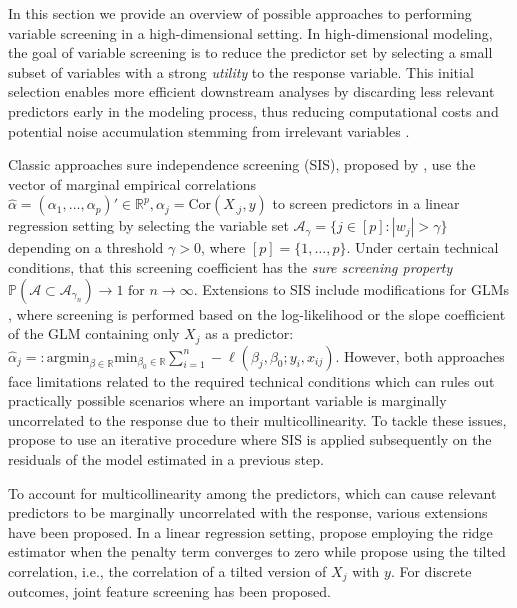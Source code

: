 \documentclass[
  article]{jss}
\begin{document}
In this section we provide an overview of possible approaches to
performing variable screening in a high-dimensional setting. In
high-dimensional modeling, the goal of variable screening is to reduce
the predictor set by selecting a small subset of variables with a strong
\emph{utility} to the response variable. This initial selection enables
more efficient downstream analyses by discarding less relevant
predictors early in the modeling process, thus reducing computational
costs and potential noise accumulation stemming from irrelevant
variables \citep[see e.g.,][]{Dunson2020TargRandProj}.

Classic approaches sure independence screening (SIS), proposed by
\citet{Fan2007SISforUHD}, use the vector of marginal empirical
correlations
\(\hat\alpha=(\alpha_1,\ldots ,\alpha_p)'\in\mathbb{R}^p,\alpha_j=\text{Cor}(X_{.j},y)\)
to screen predictors in a linear regression setting by selecting the
variable set \(\mathcal{A}_\gamma = \{j\in [p]:|w_j|>\gamma\}\)
depending on a threshold \(\gamma>0\), where \([p]=\{1,\dots,p\}\).
Under certain technical conditions, that this screening coefficient has
the \emph{sure screening property}
\(\mathbb{P}(\mathcal{A} \subset \mathcal{A}_{\gamma_n})\to 1 \text{ for } n\to \infty\).
Extensions to SIS include modifications for GLMs \citep{Fan2010sisglms},
where screening is performed based on the log-likelihood or the slope
coefficient of the GLM containing only \(X_j\) as a predictor:
\(\hat\alpha_j=: \text{argmin}_{\beta\in\mathbb{R}}\text{min}_{{\beta_0}\in\mathbb{R}}\sum_{i=1}^n -\ell(\beta_j,\beta_0;y_i,x_{ij})\).
However, both approaches face limitations related to the required
technical conditions which can rules out practically possible scenarios
where an important variable is marginally uncorrelated to the response
due to their multicollinearity. To tackle these issues,
\citet{fan2009ultrahigh} propose to use an iterative procedure where SIS
is applied subsequently on the residuals of the model estimated in a
previous step.

To account for multicollinearity among the predictors, which can cause
relevant predictors to be marginally uncorrelated with the response,
various extensions have been proposed. In a linear regression setting,
\citet{Wang2015HOLP} propose employing the ridge estimator when the
penalty term converges to zero while \citet{cho2012high} propose using
the tilted correlation, i.e., the correlation of a tilted version of
\(X_j\) with \(y\). For discrete outcomes, joint feature screening
\citet{SMLE2014} has been proposed.
\end{document}
